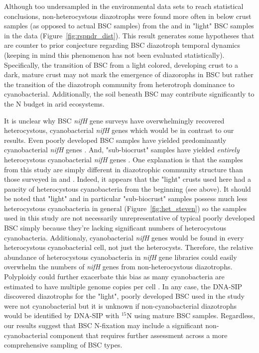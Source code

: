 Although too undersampled in the environmental data sets to reach statistical conclusions, non-heterocystous diazotrophs were found more often in below crust samples (as opposed to actual BSC samples) from the \citet{Steven_2013} and in "light" BSC samples in the \citet{Garcia_Pichel_2013} data (Figure~\ref{fig:rspndr_dist}). This result generates some hypotheses that are counter to prior conjecture regarding BSC diazotroph temporal dynamics (keeping in mind this phenomenon has not been evaluated statistically). Specifically, the transition of BSC from a light colored, developing crust to a dark, mature crust may not mark the emergence of diazorophs in BSC but rather the transition of the diazotroph community from heterotroph dominance to cyanobacterial. Additionally, the soil beneath BSC may contribute significantly to the N budget in arid ecosystems.

It is unclear why BSC \textit{nifH} gene surveys have overwhelmingly recovered heterocystous, cyanobacterial \textit{nifH} genes which would be in contrast to our results. Even poorly developed BSC samples have yielded predominantly cyanobacterial \textit{nifH} genes \cite{14766579}. And, "sub-biocrust" samples have yielded \textit{entirely} heterocystous cyanobacterial \textit{nifH} genes \cite{Yeager_2012}. One explanation is that the samples from this study are simply different in diazotrophic community structure than those surveyed in \citet{Yeager} \citet{14766579} and \citet{Yeager_2012}. Indeed, it appears that the "light" crusts used here had a paucity of heterocystous cyanobacteria from the beginning (see above). It should be noted that "light" and in particular "sub-biocrust" samples possess much less heterocystous cyanobacteria in general (Figure~\ref{fig:het_steven}) so the samples used in this study are not necessarily unrepresentative of typical poorly developed BSC simply because they're lacking significant numbers of heterocystous cyanobacteria. Additionaly, cyanobacterial \textit{nifH} genes would be found in every heterocystous cyanobacterial cell, not just the heterocysts. Therefore, the relative abundance of heterocystous cyanobacteria in \textit{nifH} gene libraries could easily overwhelm the numbers of \textit{nifH} genes from non-heterocystous diazotrophs. Polyploidy could further exacerbate this bias as many cyanobacteria are estimated to have multiple genome copies per cell \cite{Griese_2011}. In any case, the DNA-SIP discovered diazotrophs for the "light", poorly developed BSC used in the study were not cyanobacterial but it is unknown if non-cyanobacterial diazotrophs would be identified by DNA-SIP with $^{15}$N using mature BSC samples. Regardless, our results suggest that BSC N-fixation may include a significant non-cyanobacterial component that requires further assessment across a more comprehensive sampling of BSC types.

